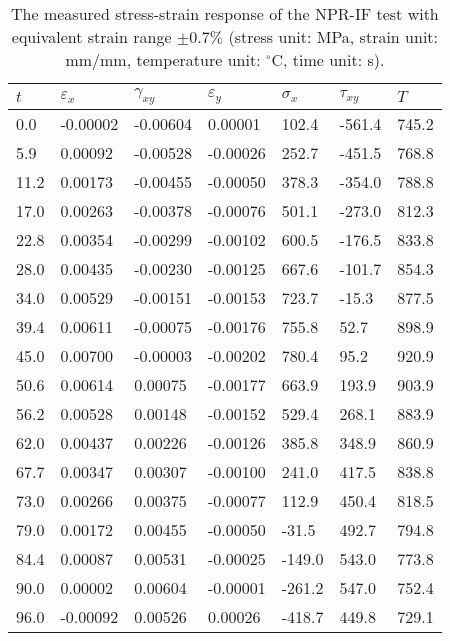 \begin{table}[htbp]
  \centering
  \caption{The measured stress-strain response of the NPR-IF test with equivalent strain range $\pm0.7\%$ (stress unit: MPa, strain unit: mm/mm, temperature unit: $^\circ$C, time unit: s).}
    \begin{tabular}{p{1.5cm}p{1.5cm}p{1.5cm}p{1.5cm}p{1.5cm}p{1.5cm}p{1.5cm}}
    \toprule
    $t$   & $\varepsilon_x$ & $\gamma_{xy}$ & $\varepsilon_y$ & $\sigma_x$ & $\tau_{xy}$ & $T$ \\
    \midrule
    0.0   & -0.00002  & -0.00604  & 0.00001  & 102.4  & -561.4  & 745.2  \\
    5.9   & 0.00092  & -0.00528  & -0.00026  & 252.7  & -451.5  & 768.8  \\
    11.2  & 0.00173  & -0.00455  & -0.00050  & 378.3  & -354.0  & 788.8  \\
    17.0  & 0.00263  & -0.00378  & -0.00076  & 501.1  & -273.0  & 812.3  \\
    22.8  & 0.00354  & -0.00299  & -0.00102  & 600.5  & -176.5  & 833.8  \\
    28.0  & 0.00435  & -0.00230  & -0.00125  & 667.6  & -101.7  & 854.3  \\
    34.0  & 0.00529  & -0.00151  & -0.00153  & 723.7  & -15.3  & 877.5  \\
    39.4  & 0.00611  & -0.00075  & -0.00176  & 755.8  & 52.7  & 898.9  \\
    45.0  & 0.00700  & -0.00003  & -0.00202  & 780.4  & 95.2  & 920.9  \\
    50.6  & 0.00614  & 0.00075  & -0.00177  & 663.9  & 193.9  & 903.9  \\
    56.2  & 0.00528  & 0.00148  & -0.00152  & 529.4  & 268.1  & 883.9  \\
    62.0  & 0.00437  & 0.00226  & -0.00126  & 385.8  & 348.9  & 860.9  \\
    67.7  & 0.00347  & 0.00307  & -0.00100  & 241.0  & 417.5  & 838.8  \\
    73.0  & 0.00266  & 0.00375  & -0.00077  & 112.9  & 450.4  & 818.5  \\
    79.0  & 0.00172  & 0.00455  & -0.00050  & -31.5  & 492.7  & 794.8  \\
    84.4  & 0.00087  & 0.00531  & -0.00025  & -149.0  & 543.0  & 773.8  \\
    90.0  & 0.00002  & 0.00604  & -0.00001  & -261.2  & 547.0  & 752.4  \\
    96.0  & -0.00092  & 0.00526  & 0.00026  & -418.7  & 449.8  & 729.1  \\

\end{tabular}
\end{table}
